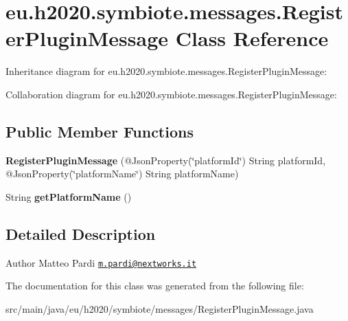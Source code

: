 \hypertarget{classeu_1_1h2020_1_1symbiote_1_1messages_1_1RegisterPluginMessage}{}\section{eu.\+h2020.\+symbiote.\+messages.\+Register\+Plugin\+Message Class Reference}
\label{classeu_1_1h2020_1_1symbiote_1_1messages_1_1RegisterPluginMessage}


Inheritance diagram for eu.\+h2020.\+symbiote.\+messages.\+Register\+Plugin\+Message\+:


Collaboration diagram for eu.\+h2020.\+symbiote.\+messages.\+Register\+Plugin\+Message\+:
\subsection*{Public Member Functions}
\begin{DoxyCompactItemize}
\item 
\mbox{\label{classeu_1_1h2020_1_1symbiote_1_1messages_1_1RegisterPluginMessage_a1a7ccd3ef31788d7b7da717dbc523f4c}} 
{\bfseries Register\+Plugin\+Message} (@Json\+Property(\char`\"{}platform\+Id\char`\"{}) String platform\+Id, @Json\+Property(\char`\"{}platform\+Name\char`\"{}) String platform\+Name)
\item 
\mbox{\label{classeu_1_1h2020_1_1symbiote_1_1messages_1_1RegisterPluginMessage_a41638a785037a59e2682879d1f0ae6c1}} 
String {\bfseries get\+Platform\+Name} ()
\end{DoxyCompactItemize}


\subsection{Detailed Description}
\begin{DoxyAuthor}{Author}
Matteo Pardi \href{mailto:m.pardi@nextworks.it}{\tt m.\+pardi@nextworks.\+it} 
\end{DoxyAuthor}


The documentation for this class was generated from the following file\+:\begin{DoxyCompactItemize}
\item 
src/main/java/eu/h2020/symbiote/messages/Register\+Plugin\+Message.\+java\end{DoxyCompactItemize}
